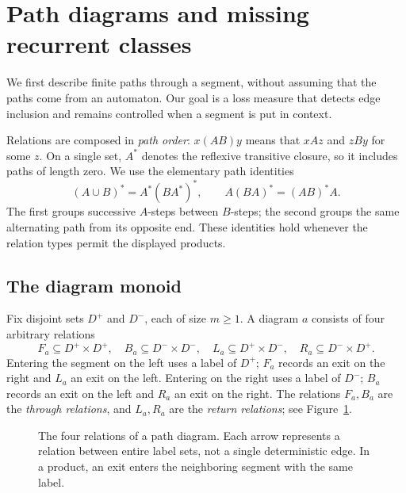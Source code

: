\section{Path diagrams and missing recurrent classes}
\label{sec:diagrams}

We first describe finite paths through a segment, without assuming that
the paths come from an automaton. Our goal is a loss measure that detects
edge inclusion and remains controlled when a segment is put in context.

Relations are composed in \emph{path order}: $x(AB)y$ means that
$xAz$ and $zBy$ for some $z$. On a single set, $A^*$ denotes the reflexive
transitive closure, so it includes paths of length zero. We use the
elementary path identities
\begin{equation}\label{diag:star}
 (A\cup B)^*=A^*(BA^*)^*,\qquad
 A(BA)^*=(AB)^*A.
\end{equation}
The first groups successive $A$-steps between $B$-steps; the second groups
the same alternating path from its opposite end. These identities hold
whenever the relation types permit the displayed products.

\subsection{The diagram monoid}

Fix disjoint sets $D^+$ and $D^-$, each of size $m\ge1$.
A diagram $a$ consists of four arbitrary relations
\[
 F_a\subseteq D^+\times D^+,\quad
 B_a\subseteq D^-\times D^-,\quad
 L_a\subseteq D^+\times D^-,\quad
 R_a\subseteq D^-\times D^+.
\]
Entering the segment on the left uses a label of $D^+$; $F_a$ records an
exit on the right and $L_a$ an exit on the left. Entering on the right uses
a label of $D^-$; $B_a$ records an exit on the left and $R_a$ an exit on
the right. The relations $F_a,B_a$ are the \emph{through relations}, and
$L_a,R_a$ are the \emph{return relations}; see Figure~\ref{fig:diagram}.

\begin{figure}[tb]
\centering
{}
\caption{The four relations of a path diagram. Each arrow represents a
relation between entire label sets, not a single deterministic edge.
In a product, an exit enters the neighboring segment with the same label.}
\label{fig:diagram}
\end{figure}

